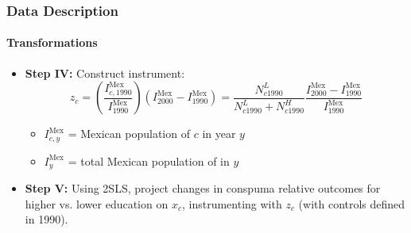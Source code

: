 \begin{frame}
    \frametitle{Data Description}
    \framesubtitle{Transformations}

    \begin{itemize}
        \item \textbf{Step IV:} Construct instrument:
        \[z_c = \left( \frac{I^{\text{Mex}}_{c,1990}}{I^{\text{Mex}}_{1990}} \right) \left( I^{\text{Mex}}_{2000} - I^{\text{Mex}}_{1990} \right) = \frac{N^L_{c1990}}{N^L_{c1990} + N^H_{c1990}} \frac{I^{\text{Mex}}_{2000} - I^{\text{Mex}}_{1990}}{I^{\text{Mex}}_{1990}}\]
    \begin{itemize}
        \item $I^{\text{Mex}}_{c,y}$ = Mexican population of $c$ in year $y$
        \item $I^{\text{Mex}}_y$ = total Mexican population of in $y$
    \end{itemize}
        \item \textbf{Step V:} Using 2SLS, project changes in conspuma relative outcomes for higher vs. lower education 
        on $x_c$, instrumenting with $z_c$ (with controls defined in 1990).
    \end{itemize}
\end{frame}

